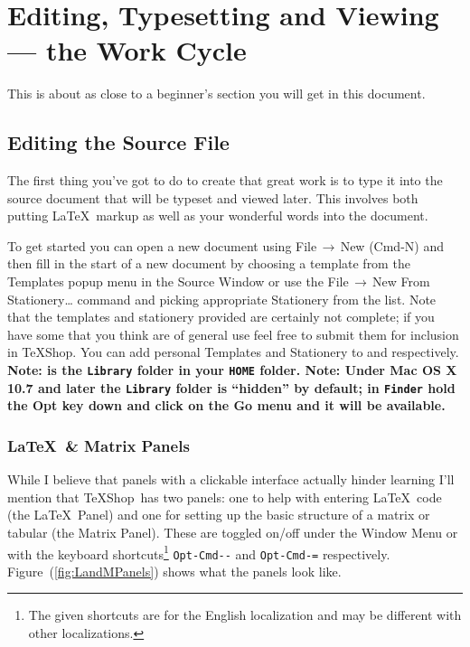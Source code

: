 \documentclass[letterpaper,11pt]{article}
\newcommand{\TS}{\textsf{\TeX Shop}}
\newcommand{\cmd}[1]{\textsf{#1}}
\newcommand{\mnu}[1]{\textsf{#1}}
\newcommand{\To}{\,\(\to\)\,}
\begin{document}
\section{Editing, Typesetting and Viewing --- the Work Cycle}

This is about as close to a beginner's section you will get in this document.

\subsection{Editing the Source File}

The first thing you've got to do to create that great work is to type it into the source document that will be typeset and viewed later. This involves both putting \LaTeX\ markup as well as your wonderful words into the document.

To get started you can open a new document using \mnu{File}\To\mnu{New} (\cmd{Cmd-N}) and then fill in the start of a new document by choosing a template from the \mnu{Templates} popup menu in the Source Window or use the \mnu{File}\To\mnu{New From Stationery…} command and picking appropriate Stationery from the list. Note that the templates and stationery provided are certainly not complete; if you have some that you think are of general use feel free to submit them for inclusion in \TS. You can add personal Templates and Stationery to  and  respectively. \textbf{Note:  is the \texttt{Library} folder in your \texttt{HOME} folder. Note: Under \textsf{Mac OS X 10.7 and later} the \texttt{Library} folder is ``hidden'' by default; in \texttt{Finder} hold the \cmd{Opt} key down and click on the \mnu{Go} menu and it will be available.}

\subsubsection{\LaTeX\ \& Matrix Panels}

While I believe that panels with a clickable interface actually hinder learning I'll mention that \TS\ has two panels: one to help with entering \LaTeX\ code (the \LaTeX\ Panel) and one for setting up the basic structure of a matrix or tabular (the Matrix Panel). These are toggled on/off under the \mnu{Window} Menu or with the keyboard shortcuts\footnote{The given shortcuts are for the English localization and may be different with other localizations.} \texttt{Opt-Cmd-{}-} and \texttt{Opt-Cmd-=} respectively. Figure~(\ref{fig:LandMPanels}) shows what the panels look like.
\end{document}
